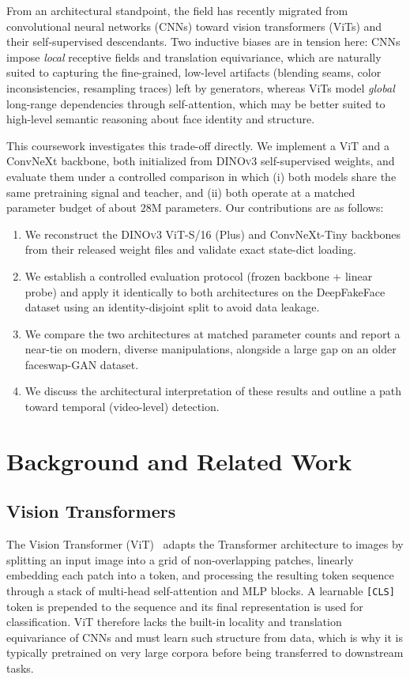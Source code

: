 \documentclass[11pt,a4paper]{article}
\begin{document}
From an architectural standpoint, the field has recently migrated from convolutional neural
networks (CNNs) toward vision transformers (ViTs) and their self-supervised descendants.
Two inductive biases are in tension here: CNNs impose \emph{local} receptive fields and
translation equivariance, which are naturally suited to capturing the fine-grained, low-level
artifacts (blending seams, color inconsistencies, resampling traces) left by generators, whereas
ViTs model \emph{global} long-range dependencies through self-attention, which may be better
suited to high-level semantic reasoning about face identity and structure.

This coursework investigates this trade-off directly. We implement a ViT and a ConvNeXt
backbone, both initialized from \textsc{DINOv3} self-supervised weights, and evaluate them under
a controlled comparison in which (i) both models share the same pretraining signal and teacher,
and (ii) both operate at a matched parameter budget of about $28$M parameters. Our contributions
are as follows:

\begin{enumerate}[leftmargin=1.5em]
  \item We reconstruct the \textsc{DINOv3} ViT-S/16 (Plus) and ConvNeXt-Tiny backbones from
        their released weight files and validate exact state-dict loading.
  \item We establish a controlled evaluation protocol (frozen backbone + linear probe) and apply
        it identically to both architectures on the DeepFakeFace dataset using an identity-disjoint
        split to avoid data leakage.
  \item We compare the two architectures at matched parameter counts and report a near-tie on
        modern, diverse manipulations, alongside a large gap on an older faceswap-GAN dataset.
  \item We discuss the architectural interpretation of these results and outline a path toward
        temporal (video-level) detection.
\end{enumerate}

\section{Background and Related Work}

\subsection{Vision Transformers}
The Vision Transformer (ViT)~\cite{dosovitskiy2021vit} adapts the Transformer architecture to
images by splitting an input image into a grid of non-overlapping patches, linearly embedding
each patch into a token, and processing the resulting token sequence through a stack of
multi-head self-attention and MLP blocks. A learnable \texttt{[CLS]} token is prepended to the
sequence and its final representation is used for classification. ViT therefore lacks the
built-in locality and translation equivariance of CNNs and must learn such structure from data,
which is why it is typically pretrained on very large corpora before being transferred to
downstream tasks.
\end{document}
